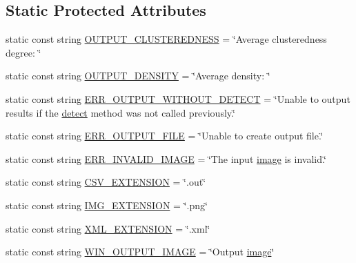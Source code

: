 \subsection*{Static Protected Attributes}
\begin{DoxyCompactItemize}
\item 
static const string \hyperlink{classmultiscale_1_1analysis_1_1Detector_a8793daa563094fdcd7447930a4fc0974}{O\-U\-T\-P\-U\-T\-\_\-\-C\-L\-U\-S\-T\-E\-R\-E\-D\-N\-E\-S\-S} = \char`\"{}Average clusteredness degree\-: \char`\"{}
\item 
static const string \hyperlink{classmultiscale_1_1analysis_1_1Detector_a920029d6b618aa2daaccfb824c5878b8}{O\-U\-T\-P\-U\-T\-\_\-\-D\-E\-N\-S\-I\-T\-Y} = \char`\"{}Average density\-: \char`\"{}
\item 
static const string \hyperlink{classmultiscale_1_1analysis_1_1Detector_a5837f0e4ffef6410774ff9bcda72238b}{E\-R\-R\-\_\-\-O\-U\-T\-P\-U\-T\-\_\-\-W\-I\-T\-H\-O\-U\-T\-\_\-\-D\-E\-T\-E\-C\-T} = \char`\"{}Unable to output results if the \hyperlink{classmultiscale_1_1analysis_1_1Detector_acfb9aaec94382e4a7bee6d9874d4bcef}{detect} method was not called previously.\char`\"{}
\item 
static const string \hyperlink{classmultiscale_1_1analysis_1_1Detector_aab6b3a68e93cad9a93885e52f1c2ce04}{E\-R\-R\-\_\-\-O\-U\-T\-P\-U\-T\-\_\-\-F\-I\-L\-E} = \char`\"{}Unable to create output file.\char`\"{}
\item 
static const string \hyperlink{classmultiscale_1_1analysis_1_1Detector_aa5dc8982745f567379e0eccd416c6820}{E\-R\-R\-\_\-\-I\-N\-V\-A\-L\-I\-D\-\_\-\-I\-M\-A\-G\-E} = \char`\"{}The input \hyperlink{classmultiscale_1_1analysis_1_1Detector_a523830a6cfe409694ce8327c3c736fbd}{image} is invalid.\char`\"{}
\item 
static const string \hyperlink{classmultiscale_1_1analysis_1_1Detector_a5458417daa8430ea8ebbe1c25cb26f41}{C\-S\-V\-\_\-\-E\-X\-T\-E\-N\-S\-I\-O\-N} = \char`\"{}.out\char`\"{}
\item 
static const string \hyperlink{classmultiscale_1_1analysis_1_1Detector_acc73b4fb215305ffd7f3d6df8807cc5e}{I\-M\-G\-\_\-\-E\-X\-T\-E\-N\-S\-I\-O\-N} = \char`\"{}.png\char`\"{}
\item 
static const string \hyperlink{classmultiscale_1_1analysis_1_1Detector_a89d56e81155e57f3dcaeef293e89efc2}{X\-M\-L\-\_\-\-E\-X\-T\-E\-N\-S\-I\-O\-N} = \char`\"{}.xml\char`\"{}
\item 
static const string \hyperlink{classmultiscale_1_1analysis_1_1Detector_a883b5de8d273a2bfab31e45bc285c78d}{W\-I\-N\-\_\-\-O\-U\-T\-P\-U\-T\-\_\-\-I\-M\-A\-G\-E} = \char`\"{}Output \hyperlink{classmultiscale_1_1analysis_1_1Detector_a523830a6cfe409694ce8327c3c736fbd}{image}\char`\"{}

\end{DoxyCompactItemize}

